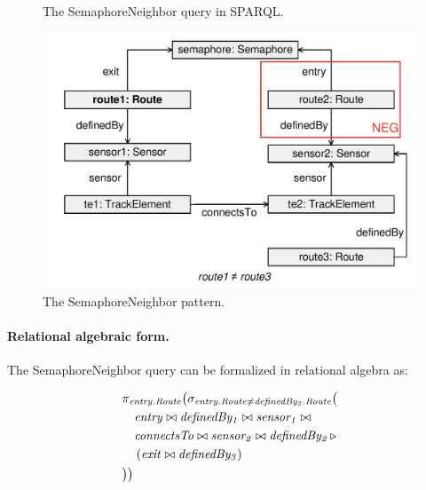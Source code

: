 \begin{figure}[htb]
\centering
\begin{minipage}{0.6\textwidth}
  { \alignListing
    }
  \caption{The \textsf{SemaphoreNeighbor} query in SPARQL.}
  \label{lst:semaphoreneighbor-sparql}
\end{minipage}
\end{figure}

\begin{figure}[htb]
		\centering
		\includegraphics[scale=0.4]{figures/pattern-semaphoreneighbor}
		\caption{The \textsf{SemaphoreNeighbor} pattern.}
		\label{fig:pattern-semaphoreneighbor}
\end{figure}

\paragraph{Relational algebraic form.} The \textsf{SemaphoreNeighbor} query can be formalized in relational algebra as:

\begin{align*}
& \pi_{\mathit{entry.Route}} \big( \sigma_{\mathit{entry.Route} \neq \mathit{definedBy_2.Route}} \big( \\
& \quad \mathit{entry} \bowtie \mathit{definedBy_1} \bowtie \mathit{sensor_1} \bowtie \\
& \quad \mathit{connectsTo} \bowtie \mathit{sensor_2} \bowtie \mathit{definedBy_2} \, \triangleright \, \\
& \quad \left( \mathit{exit} \bowtie \mathit{definedBy_3} \right) \\
& \big) \big)
\end{align*}

